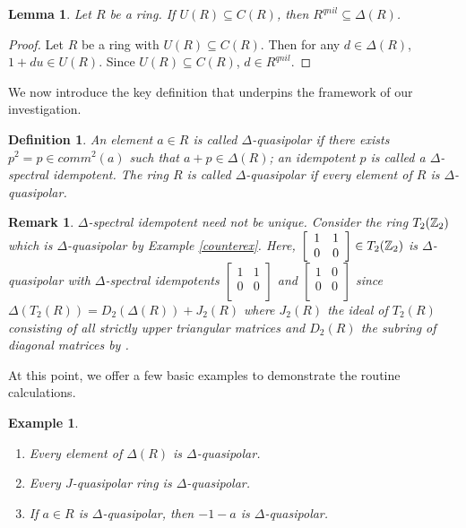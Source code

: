 \documentclass[12pt, reqno]{amsart}
\newtheorem{lem}[thm]{Lemma}
\newtheorem{defn}[thm]{Definition}
\newtheorem{rem}[thm]{\bf{Remark}}
\newtheorem{exam}[thm]{Example}
\numberwithin{equation}{section}
\begin{document}
\begin{lem}
    Let $R$ be a ring. If $U(R)\subseteq C(R)$, then $R^{qnil}\subseteq \Delta(R)$.
\end{lem}

\begin{proof}
    Let $R$ be a ring with $U(R)\subseteq C(R)$. Then for any $d\in \Delta(R)$, $1+du\in U(R)$. Since $U(R)\subseteq C(R)$, $d\in R^{qnil}$.
\end{proof}

We now introduce the key definition that underpins the framework of our investigation.
\begin{defn}
{\rm    An element $a\in R$ is called $\Delta$-quasipolar if there exists $p^2=p\in comm^2(a)$ such that $a+p\in \Delta (R)$; an idempotent $p$ is called a $\Delta$-spectral idempotent.  The ring $R$ is called $\Delta$-quasipolar if every element of $R$ is $\Delta$-quasipolar.}
\end{defn}

\begin{rem}
   {\rm $\Delta$-spectral idempotent need not be unique. Consider the ring $T_2(\Bbb Z_2)$ which is $\Delta$-quasipolar by Example \ref{counterex}. Here, $\left[%
\begin{array}{cc}
  1 & 1 \\
  0 & 0 \\
\end{array}%
\right] \in T_2(\Bbb Z_2)$ is $\Delta$-quasipolar with $\Delta$-spectral idempotents $\left[%
\begin{array}{cc}
  1 & 1 \\
  0 & 0 \\
\end{array}%
\right] $ and $\left[%
\begin{array}{cc}
  1 & 0 \\
  0 & 0 \\
\end{array}%
\right] $ since $\Delta(T_2(R)) = D_2(\Delta(R)) + J_2(R)$ where $J_2(R)$ the ideal of $T_2(R)$ consisting of all strictly upper triangular matrices and $D_2(R)$ the
subring of diagonal matrices by \cite{Leroy}.}
\end{rem}

At this point, we offer a few basic examples to demonstrate the routine calculations.
\begin{exam}\label{example}
   {\rm \begin{enumerate}
        \item Every element of $\Delta(R)$ is $\Delta$-quasipolar.
        \item Every $J$-quasipolar ring is $\Delta$-quasipolar. 
        \item If $a\in R$ is $\Delta$-quasipolar, then $-1-a$ is $\Delta$-quasipolar.
    \end{enumerate}}
\end{exam}
\end{document}
